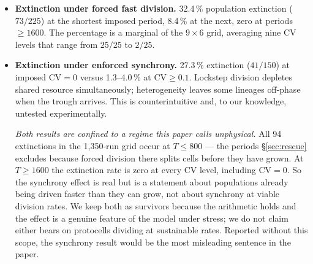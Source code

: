 \documentclass[11pt,letterpaper]{article}
\begin{document}
\begin{itemize}
      \emph{The mechanism is not identified.} An earlier draft of this
      section wrote the result as ``higher supply $\to$ faster division
      $\to$ lower stability,'' asserting mediation through division
      rate. Our own Table~\ref{tab:simpson} refutes it: within every
      lipid stratum, slower division goes with \emph{lower} stability
      ($\rho = -0.60$ to $-0.75$), which is the opposite of what that
      chain predicts. Attributing a between-condition association to a
      plausible intermediate variable, in the presence of stratified
      data contradicting it, is Defect 6 committed again --- and it
      survived into a draft of the section titled ``What survives.''
      What is supported is the association and its direction, nothing
      about the path.
\item \textbf{Extinction under forced fast division.} 32.4\,\%
      population extinction ($73/225$) at the shortest imposed period,
      8.4\,\% at the next, zero at periods $\geq 1600$. The percentage
      is a marginal of the $9 \times 6$ grid, averaging nine
      $\mathrm{CV}$ levels that range from $25/25$ to $2/25$.
\item \textbf{Extinction under enforced synchrony.} 27.3\,\%
      extinction ($41/150$) at imposed $\mathrm{CV} = 0$ versus
      1.3--4.0\,\% at $\mathrm{CV} \geq 0.1$. Lockstep division depletes
      shared resource simultaneously; heterogeneity leaves some lineages
      off-phase when the trough arrives. This is counterintuitive and,
      to our knowledge, untested experimentally.

      \emph{Both results are confined to a regime this paper calls
      unphysical.} All 94 extinctions in the 1{,}350-run grid occur at
      $T \leq 800$ --- the periods \S\ref{sec:rescue} excludes because
      forced division there splits cells before they have grown. At
      $T \geq 1600$ the extinction rate is zero at every
      $\mathrm{CV}$ level, including $\mathrm{CV} = 0$. So the
      synchrony effect is real but is a statement about populations
      already being driven faster than they can grow, not about
      synchrony at viable division rates. We keep both as survivors
      because the arithmetic holds and the effect is a genuine feature
      of the model under stress; we do not claim either bears on
      protocells dividing at sustainable rates. Reported without this
      scope, the synchrony result would be the most misleading sentence
      in the paper.
\end{itemize}
\end{document}
